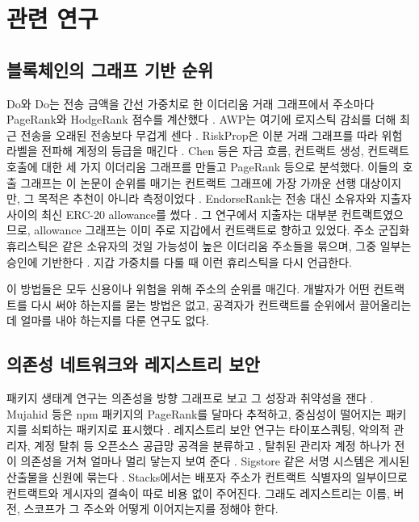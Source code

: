 \section{관련 연구}
\label{sec:related}

\subsection{블록체인의 그래프 기반 순위}

Do와 Do는 전송 금액을 간선 가중치로 한 이더리움 거래 그래프에서 주소마다 PageRank와 HodgeRank 점수를 계산했다 \cite{do2023hodgerank}. AWP는 여기에 로지스틱 감쇠를 더해 최근 전송을 오래된 전송보다 무겁게 센다 \cite{do2023awp}. RiskProp은 이분 거래 그래프를 따라 위험 라벨을 전파해 계정의 등급을 매긴다 \cite{lin2025riskprop}. Chen 등은 자금 흐름, 컨트랙트 생성, 컨트랙트 호출에 대한 세 가지 이더리움 그래프를 만들고 PageRank 등으로 분석했다. 이들의 호출 그래프는 이 논문이 순위를 매기는 컨트랙트 그래프에 가장 가까운 선행 대상이지만, 그 목적은 추천이 아니라 측정이었다 \cite{chen2018ethereum}. EndorseRank는 전송 대신 소유자와 지출자 사이의 최신 ERC-20 allowance를 썼다 \cite{kwon2026endorserank}. 그 연구에서 지출자는 대부분 컨트랙트였으므로, allowance 그래프는 이미 주로 지갑에서 컨트랙트로 향하고 있었다. 주소 군집화 휴리스틱은 같은 소유자의 것일 가능성이 높은 이더리움 주소들을 묶으며, 그중 일부는 승인에 기반한다 \cite{victor2020clustering}. 지갑 가중치를 다룰 때 이런 휴리스틱을 다시 언급한다.

이 방법들은 모두 신용이나 위험을 위해 주소의 순위를 매긴다. 개발자가 어떤 컨트랙트를 다시 써야 하는지를 묻는 방법은 없고, 공격자가 컨트랙트를 순위에서 끌어올리는 데 얼마를 내야 하는지를 다룬 연구도 없다.

\subsection{의존성 네트워크와 레지스트리 보안}

패키지 생태계 연구는 의존성을 방향 그래프로 보고 그 성장과 취약성을 잰다 \cite{kikas2017structure,decan2019empirical}. Mujahid 등은 npm 패키지의 PageRank를 달마다 추적하고, 중심성이 떨어지는 패키지를 쇠퇴하는 패키지로 표시했다 \cite{mujahid2021centrality}. 레지스트리 보안 연구는 타이포스쿼팅, 악의적 관리자, 계정 탈취 등 오픈소스 공급망 공격을 분류하고 \cite{ohm2020backstabber,ladisa2023sok,vu2020typosquatting}, 탈취된 관리자 계정 하나가 전이 의존성을 거쳐 얼마나 멀리 닿는지 보여 준다 \cite{zimmermann2019small}. Sigstore 같은 서명 시스템은 게시된 산출물을 신원에 묶는다 \cite{newman2022sigstore}. Stacks에서는 배포자 주소가 컨트랙트 식별자의 일부이므로 컨트랙트와 게시자의 결속이 따로 비용 없이 주어진다. 그래도 레지스트리는 이름, 버전, 스코프가 그 주소와 어떻게 이어지는지를 정해야 한다.

